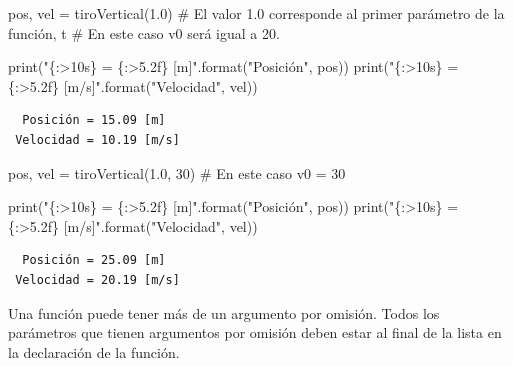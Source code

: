 \documentclass[
  spanish,
  letterpaper,
]{scrbook}
\newenvironment{Shaded}{\begin{snugshade}}{\end{snugshade}}
\newcommand{\BuiltInTok}[1]{\textcolor[rgb]{0.00,0.23,0.31}{#1}}
\newcommand{\CommentTok}[1]{\textcolor[rgb]{0.37,0.37,0.37}{#1}}
\newcommand{\DecValTok}[1]{\textcolor[rgb]{0.68,0.00,0.00}{#1}}
\newcommand{\FloatTok}[1]{\textcolor[rgb]{0.68,0.00,0.00}{#1}}
\newcommand{\NormalTok}[1]{\textcolor[rgb]{0.00,0.23,0.31}{#1}}
\newcommand{\OperatorTok}[1]{\textcolor[rgb]{0.37,0.37,0.37}{#1}}
\newcommand{\SpecialCharTok}[1]{\textcolor[rgb]{0.37,0.37,0.37}{#1}}
\newcommand{\StringTok}[1]{\textcolor[rgb]{0.13,0.47,0.30}{#1}}
\theoremstyle{definition}
\theoremstyle{remark}
\begin{document}
\begin{Shaded}
\begin{Highlighting}[]
\NormalTok{pos, vel }\OperatorTok{=}\NormalTok{ tiroVertical(}\FloatTok{1.0}\NormalTok{) }\CommentTok{\# El valor 1.0 corresponde al primer parámetro de la función, \textquotesingle{}t\textquotesingle{}}
                             \CommentTok{\# En este caso v0 será igual a 20.}

\BuiltInTok{print}\NormalTok{(}\StringTok{"}\SpecialCharTok{\{:\textgreater{}10s\}}\StringTok{ = }\SpecialCharTok{\{:\textgreater{}5.2f\}}\StringTok{ [m]"}\NormalTok{.}\BuiltInTok{format}\NormalTok{(}\StringTok{"Posición"}\NormalTok{, pos))}
\BuiltInTok{print}\NormalTok{(}\StringTok{"}\SpecialCharTok{\{:\textgreater{}10s\}}\StringTok{ = }\SpecialCharTok{\{:\textgreater{}5.2f\}}\StringTok{ [m/s]"}\NormalTok{.}\BuiltInTok{format}\NormalTok{(}\StringTok{"Velocidad"}\NormalTok{, vel))}
\end{Highlighting}
\end{Shaded}

\begin{verbatim}
  Posición = 15.09 [m]
 Velocidad = 10.19 [m/s]
\end{verbatim}

\begin{Shaded}
\begin{Highlighting}[]
\NormalTok{pos, vel }\OperatorTok{=}\NormalTok{ tiroVertical(}\FloatTok{1.0}\NormalTok{, }\DecValTok{30}\NormalTok{) }\CommentTok{\# En este caso v0 = 30}

\BuiltInTok{print}\NormalTok{(}\StringTok{"}\SpecialCharTok{\{:\textgreater{}10s\}}\StringTok{ = }\SpecialCharTok{\{:\textgreater{}5.2f\}}\StringTok{ [m]"}\NormalTok{.}\BuiltInTok{format}\NormalTok{(}\StringTok{"Posición"}\NormalTok{, pos))}
\BuiltInTok{print}\NormalTok{(}\StringTok{"}\SpecialCharTok{\{:\textgreater{}10s\}}\StringTok{ = }\SpecialCharTok{\{:\textgreater{}5.2f\}}\StringTok{ [m/s]"}\NormalTok{.}\BuiltInTok{format}\NormalTok{(}\StringTok{"Velocidad"}\NormalTok{, vel))}
\end{Highlighting}
\end{Shaded}

\begin{verbatim}
  Posición = 25.09 [m]
 Velocidad = 20.19 [m/s]
\end{verbatim}

Una función puede tener más de un argumento por omisión. Todos los
parámetros que tienen argumentos por omisión deben estar al final de la
lista en la declaración de la función.
\end{document}
